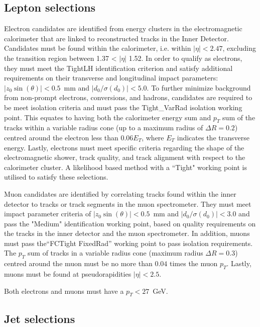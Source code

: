 \documentclass[10pt,a4paper]{book}
\begin{document}
\subsection{Lepton selections}
Electron candidates are identified from energy clusters in the electromagnetic calorimeter that are linked to reconstructed tracks in the Inner Detector. Candidates must be found within the calorimeter, i.e. within $\vert \eta \vert < 2.47$, excluding the transition region between 1.37 < $\vert \eta \vert$ 1.52. In order to qualify as electrons, they must meet the TightLH identification criterion and satisfy additional requirements on their transverse and longitudinal impact parameters: $\vert z_0\sin(\theta)\vert  < 0.5$~mm and $\vert d_0/\sigma(d_0)\vert < 5.0$. To further minimize background from non-prompt electrons, conversions, and hadrons, candidates are required to be meet isolation criteria and must pass the Tight\_VarRad isolation working point. This equates to having both the calorimeter energy sum and $p_T$ sum of the tracks within a variable radius cone (up to a maximum radius of $\Delta R = 0.2$) centred around the electron less than $0.06 E_T$, where $E_T$ indicates the transverse energy. Lastly, electrons must meet specific criteria regarding the shape of the electromagnetic shower, track quality, and track alignment with respect to the calorimeter cluster. A likelihood based method with a ``Tight" working point is utilised to satisfy these selections.

Muon candidates are identified by correlating tracks found within the inner detector to tracks or track segments in the muon spectrometer. They must meet impact parameter criteria of $\vert z_0\sin(\theta)\vert  < 0.5$~mm and $\vert d_0/\sigma(d_0)\vert < 3.0$ and pass the "Medium" identification working point, based on quality requirements on the tracks in the inner detector and the muon spectrometer. In addition, muons must pass the``FCTight FixedRad” working point to pass isolation requirements. The $p_T$ sum of tracks in a variable radius cone (maximum radius $\Delta R = 0.3$) centred around the muon must be no more than $0.04$ times the muon $p_T$. Lastly, muons must be found at pseudorapidities $\vert \eta \vert < 2.5$. 

Both electrons and muons must have a $p_T < 27$~GeV.

\subsection{Jet selections}
\end{document}
